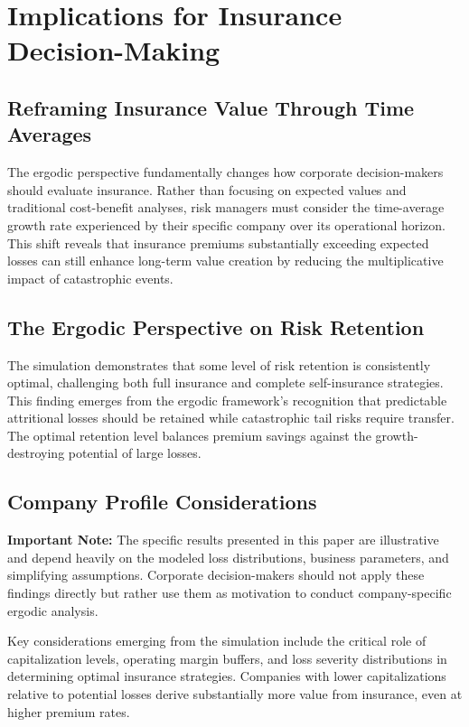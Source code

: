 \documentclass[11pt,letterpaper]{article}
\begin{document}
\section{Implications for Insurance Decision-Making}

\subsection{Reframing Insurance Value Through Time Averages}

The ergodic perspective fundamentally changes how corporate decision-makers should evaluate insurance. Rather than focusing on expected values and traditional cost-benefit analyses, risk managers must consider the time-average growth rate experienced by their specific company over its operational horizon. This shift reveals that insurance premiums substantially exceeding expected losses can still enhance long-term value creation by reducing the multiplicative impact of catastrophic events.

\subsection{The Ergodic Perspective on Risk Retention}

The simulation demonstrates that some level of risk retention is consistently optimal, challenging both full insurance and complete self-insurance strategies. This finding emerges from the ergodic framework's recognition that predictable attritional losses should be retained while catastrophic tail risks require transfer. The optimal retention level balances premium savings against the growth-destroying potential of large losses.

\subsection{Company Profile Considerations}

\textbf{Important Note:} The specific results presented in this paper are illustrative and depend heavily on the modeled loss distributions, business parameters, and simplifying assumptions. Corporate decision-makers should not apply these findings directly but rather use them as motivation to conduct company-specific ergodic analysis.

Key considerations emerging from the simulation include the critical role of capitalization levels, operating margin buffers, and loss severity distributions in determining optimal insurance strategies. Companies with lower capitalizations relative to potential losses derive substantially more value from insurance, even at higher premium rates.
\end{document}
